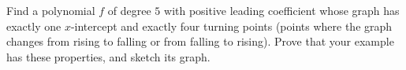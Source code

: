 Find a polynomial $f$ of degree $5$ with positive leading coefficient whose graph has exactly one $x$-intercept and exactly four turning points (points where the graph changes from rising to falling or from falling to rising). Prove that your example has these properties, and sketch its graph.

